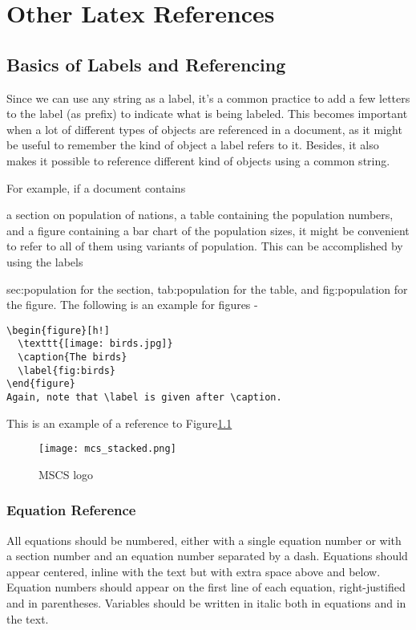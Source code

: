 \clearpage %

\chapter{Other Latex References}\label{CH3_AIM1}


\section{Basics of Labels and Referencing}

Since we can use any string as a label, it's a common practice to add a few letters to the label (as prefix) to indicate what is being labeled. This becomes important when a lot of different types of objects are referenced in a document, as it might be useful to remember the kind of object a label refers to it. Besides, it also makes it possible to reference different kind of objects using a common string.

For example, if a document contains

a section on population of nations,
a table containing the population numbers, and
a figure containing a bar chart of the population sizes,
it might be convenient to refer to all of them using variants of population. This can be accomplished by using the labels

sec:population for the section,
tab:population for the table, and
fig:population for the figure.
The following is an example for figures -

\begin{verbatim}
\begin{figure}[h!]
  \texttt{[image: birds.jpg]}
  \caption{The birds}
  \label{fig:birds}
\end{figure}
Again, note that \label is given after \caption.
\end{verbatim}

 This is an example of a reference to Figure\ref{fig:logo}


\begin{figure}[h]
\centering
\texttt{[image: mcs\_stacked.png]}
 \caption{MSCS logo}
 \label{fig:logo}
\end{figure}

\subsection{Equation Reference}
All equations should be numbered, either with a single equation number 
or with a section number and an equation number separated by a 
dash. Equations should appear centered, inline with the text but 
with extra space above and below. Equation numbers 
should appear on the first line of each equation, right-justified 
and in parentheses. Variables should be written in italic both in 
equations and in the text.

